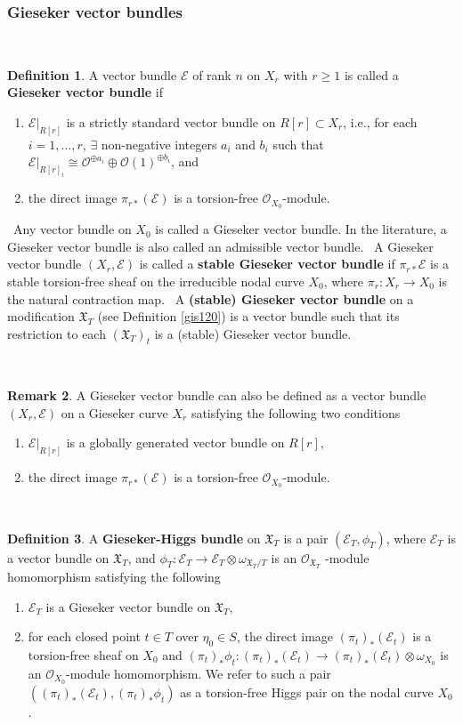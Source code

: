 \documentclass[11pt]{amsart}
\theoremstyle{plain}
\numberwithin{equation}{section}
\theoremstyle{definition}
\newtheorem{Def}{Definition}[section]
\newtheorem{Rem}[Def]{Remark}
\theoremstyle{plain}
\begin{document}
\subsubsection{Gieseker vector bundles}
\
\begin{Def}\label{Gie1101}
A vector bundle $\mathcal E$ of rank $n$ on $X_r$ with $r\geq 1$ is called a \textbf{Gieseker vector bundle} if
 \begin{enumerate}
\item $\mathcal E|_{R[r]}$ is a strictly standard vector bundle on $R[r]\subset X_r$, i.e., for each $i=1,\dots, r $, $\exists$ non-negative integers $a_i$ and $b_i$ such that $\mathcal E|_{R[r]_i}\cong \mathcal O^{\oplus a_i}\oplus \mathcal O(1)^{\oplus b_i}$, and
\item the direct image $\pi_{r *}(\mathcal{E})$ is a torsion-free $\mathcal O_{X_0}$-module.
\end{enumerate}
\
Any vector bundle on $X_0$ is called a Gieseker vector bundle. In the literature, a Gieseker vector bundle is also called an admissible vector bundle.
\
A Gieseker vector bundle $(X_r, \mathcal E)$ is called a \textbf{stable Gieseker vector bundle} if $\pi_{r *}\mathcal{E}$ is a stable torsion-free sheaf on the irreducible nodal curve $X_0$, where $\pi_r: X_r\longrightarrow X_0$ is the natural contraction map.
\
A \textbf{(stable) Gieseker vector bundle} on a modification $\mathfrak X_T$ (see Definition \ref{gis120}) is a vector bundle such that its restriction to each $(\mathfrak X_{T})_t$ is a (stable) Gieseker vector bundle.
\end{Def}
\
\begin{Rem}\label{AltGie}
A Gieseker vector bundle can also be defined as a vector bundle $(X_r, \mathcal E)$ on a Gieseker curve $X_r$ satisfying the following two conditions
\begin{enumerate}
\item $\mathcal E|_{R[r]}$ is a globally generated vector bundle on $R[r]$,
\item the direct image $\pi_{r *}(\mathcal E)$ is a torsion-free $\mathcal O_{X_0}$-module.\end{enumerate}
\end{Rem}
\
\begin{Def}\label{gis1} A \textbf{Gieseker-Higgs bundle} on $\mathfrak X_T$ is a pair
$(\mathcal E_T , \phi_T )$, where $\mathcal E_T$ is a vector bundle on $\mathfrak X_T$, and $\phi_T : \mathcal E_T \longrightarrow \mathcal E_T \otimes \omega_{\mathfrak X_T/T}$ is an $\mathcal O_{\mathfrak X_T}$ -module homomorphism satisfying the following
\begin{enumerate}
\item $\mathcal E_T$ is a Gieseker vector bundle on $\mathfrak X_T$,
\item for each closed point $t \in T$ over $\eta_0 \in S$, the direct image $(\pi_t)_*(\mathcal E_t)$ is a torsion-free sheaf on $X_0$ and $(\pi_t)_*\phi_t: (\pi_t)_*(\mathcal E_t)\longrightarrow (\pi_t)_*(\mathcal E_t)\otimes \omega_{X_0}$ is an $\mathcal O_{X_0}$-module homomorphism. We refer to such a pair $((\pi_t)_*(\mathcal E_t), (\pi_t)_*\phi_t)$ as a torsion-free Higgs pair on the nodal curve $X_0$.
\end{enumerate}
\end{Def}
\end{document}

